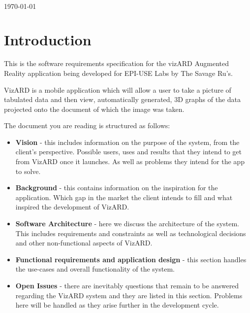 \documentclass[a4paper,12pt]{article}
\begin{document}
\begin{titlepage}
\begin{minipage}{0.4\textwidth}
\begin{flushright}
\end{flushright}
\end{minipage}\\[4cm]



{\large \today}\\[3cm] %

 

\vfill %

\end{titlepage}

\newpage

\tableofcontents

\newpage

\section{Introduction}

This is the software requirements specification for the vizARD Augmented Reality application being developed for EPI-USE Labs by The Savage Ru's.

VizARD is a mobile application which will allow a user to take a picture of tabulated data and then view, automatically generated, 3D graphs of the data projected onto the document of which the image was taken.

The document you are reading is structured as follows:
\begin{itemize}
	\item \textbf{Vision} - this includes information on the purpose of the system, from the client's perspective. Possible users, uses and results that they intend to get from VizARD once it launches. As well as problems they intend for the app to solve.
	\item \textbf{Background} - this contains information on the inspiration for the application. Which gap in the market the client intends to fill and what inspired the development of VizARD.
	\item \textbf{Software Architecture} - here we discuss the architecture of the system.
	This includes requirements and constraints as well as technological decisions and other non-functional aspects of VizARD.
	\item \textbf{Functional requirements and application design} - this section handles the use-cases and overall functionality of the system.
	\item \textbf{Open Issues} - there are inevitably questions that remain to be answered regarding the VizARD system and they are listed in this section. Problems here will be handled as they arise further in the development cycle.
\end{itemize}
\end{document}
